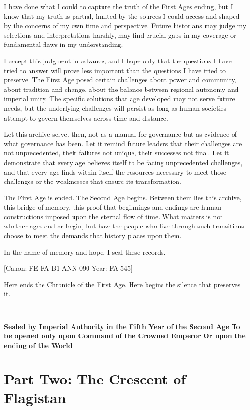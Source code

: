 I have done what I could to capture the truth of the First
Age\textquotesingle s ending, but I know that my truth is partial,
limited by the sources I could access and shaped by the concerns of my
own time and perspective. Future historians may judge my selections and
interpretations harshly, may find crucial gaps in my coverage or
fundamental flaws in my understanding.

I accept this judgment in advance, and I hope only that the questions I
have tried to answer will prove less important than the questions I have
tried to preserve. The First Age posed certain challenges about power
and community, about tradition and change, about the balance between
regional autonomy and imperial unity. The specific solutions that age
developed may not serve future needs, but the underlying challenges will
persist as long as human societies attempt to govern themselves across
time and distance.

Let this archive serve, then, not as a manual for governance but as
evidence of what governance has been. Let it remind future leaders that
their challenges are not unprecedented, their failures not unique, their
successes not final. Let it demonstrate that every age believes itself
to be facing unprecedented challenges, and that every age finds within
itself the resources necessary to meet those challenges or the
weaknesses that ensure its transformation.

The First Age is ended. The Second Age begins. Between them lies this
archive, this bridge of memory, this proof that beginnings and endings
are human constructions imposed upon the eternal flow of time. What
matters is not whether ages end or begin, but how the people who live
through such transitions choose to meet the demands that history places
upon them.

In the name of memory and hope, I seal these records.

{[}Canon: FE-FA-B1-ANN-090 \textbar{} Year: FA 545{]}

Here ends the Chronicle of the First Age. Here begins the silence that
preserves it.

---

\textbf{Sealed by Imperial Authority in the Fifth Year of the Second
Age} \textbf{To be opened only upon Command of the Crowned Emperor}
\textbf{Or upon the ending of the World}

\section{Part Two: The Crescent of
Flagistan}\label{part-two-the-crescent-of-flagistan}

